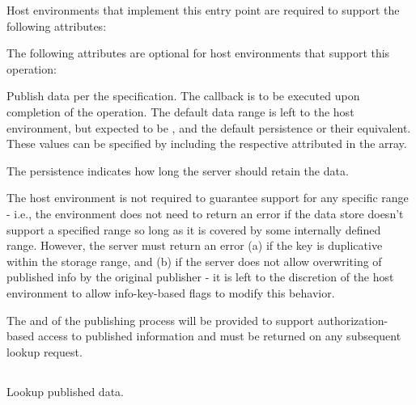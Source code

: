 
\divider

Host environments that implement this entry point are required to support the following attributes:


\reqattrend

\optattrstart
The following attributes are optional for host environments that support this operation:


\optattrend

\descr

Publish data per the  specification.
The callback is to be executed upon completion of the operation.
The default data range is left to the host environment, but expected to be , and the default persistence  or their equivalent.
These values can be specified by including the respective attributed in the  array.

The persistence indicates how long the server should retain the data.

\advicermstart
The host environment is not required to guarantee support for any specific range - i.e., the environment does not need to return an error if the data store doesn't support a specified range so long as it is covered by some internally defined range.
However, the server must return an error (a) if the key is duplicative within the storage range, and (b) if the server does not allow overwriting of published info by the original publisher - it is left to the discretion of the host environment to allow info-key-based flags to modify this behavior.

The  and  of the publishing process will be provided to support authorization-based access to published information and must be returned on any subsequent lookup request.
\advicermend

\subsection{}

\summary

Lookup published data.

